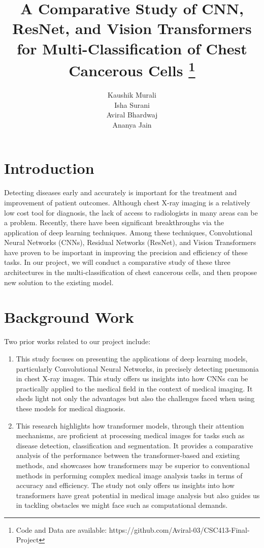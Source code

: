 \documentclass{article}
\title{A Comparative Study of CNN, ResNet, and Vision Transformers for Multi-Classification of Chest Cancerous Cells \thanks{Code and Data are available: https://github.com/Aviral-03/CSC413-Final-Project}}
\author{
    Kaushik Murali \\
    \And
    Isha Surani \\
    \And
    Aviral Bhardwaj \\
    \And
    Ananya Jain \\
}
\begin{document}
\maketitle
\section{Introduction}

Detecting diseases early and accurately is important for the treatment and improvement of patient outcomes. Although chest X-ray imaging is a relatively low cost tool for diagnosis, the lack of access to radiologists in many areas can be a problem. Recently, there have been significant breakthroughs via the application of deep learning techniques. Among these techniques, Convolutional Neural Networks (CNNs), Residual Networks (ResNet), and Vision Transformers have proven to be important in improving the precision and efficiency of these tasks. In our project, we will conduct a comparative study of these three architectures in the multi-classification of chest cancerous cells, and then propose new solution to the existing model.

\section{Background Work}


Two prior works related to our project include: 
\begin{enumerate}
    \item \textbf{\citet{kermany2018identifying}}
This study focuses on presenting the applications of deep learning models, particularly Convolutional Neural Networks, in precisely detecting pneumonia in chest X-ray images. This study offers us insights into how CNNs can be practically applied to the medical field in the context of medical imaging. It sheds light not only the advantages but also the challenges faced when using these models for medical diagnosis.

    \item \textbf{\citet{liu2023recent}}
This research highlights how transformer models, through their attention mechanisms, are proficient at processing medical images for tasks such as disease detection, classification and segmentation. It provides a comparative analysis of the performance between the transformer-based and existing methods, and showcases how transformers may be superior to conventional methods in performing complex medical image analysis tasks in terms of accuracy and efficiency. The study not only offers us insights into how transformers have great potential in medical image analysis but also guides us in tackling obstacles we might face such as computational demands.
\end{enumerate}
\end{document}
